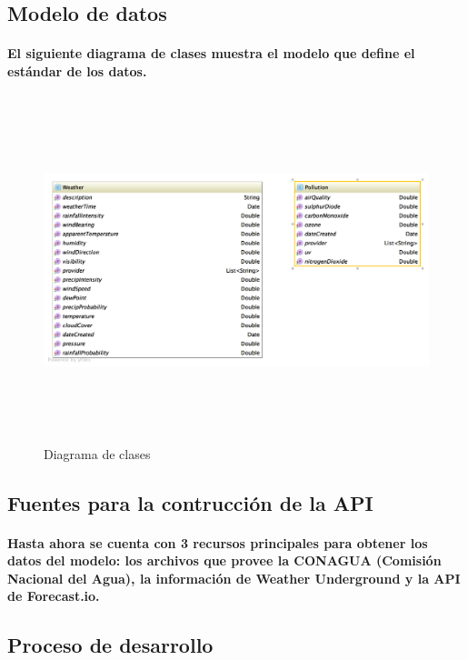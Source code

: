   \newpage   
  \subsection{Modelo de datos} 
  \paragraph{El siguiente diagrama de clases muestra el modelo que define el estándar de los datos.}
    \begin{figure}[b!]
    \begin{center}
      \includegraphics[width=14cm,height=10cm]{./images/SmartOwl_ClassDiagram}
      \caption{Diagrama de clases}
    \end{center}
    \end{figure}
  \newpage
  \subsection{Fuentes para la contrucción de la API}
    \paragraph{Hasta ahora se cuenta con 3 recursos principales para obtener los datos del modelo: los archivos que provee la CONAGUA (Comisión Nacional del Agua), la información de Weather Underground y la API de Forecast.io.}
     
  \subsection{Proceso de desarrollo} 
